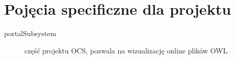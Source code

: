 \documentclass[a4paper,10pt]{article}
\begin{document}
\section{Pojęcia specificzne dla projektu}
\begin{description}
 \item[portalSubsystem] część projektu OCS, pozwala na wizualizację online plików OWL 
\end{description}



\clearpage
{}
{}

\end{document}
